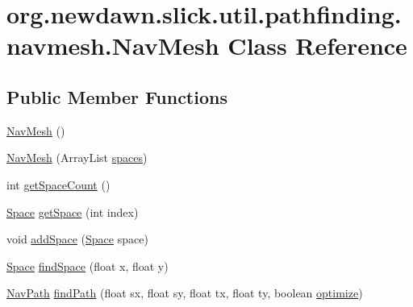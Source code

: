 \hypertarget{classorg_1_1newdawn_1_1slick_1_1util_1_1pathfinding_1_1navmesh_1_1_nav_mesh}{}\section{org.\+newdawn.\+slick.\+util.\+pathfinding.\+navmesh.\+Nav\+Mesh Class Reference}
\label{classorg_1_1newdawn_1_1slick_1_1util_1_1pathfinding_1_1navmesh_1_1_nav_mesh}
\subsection*{Public Member Functions}
\begin{DoxyCompactItemize}
\item 
\mbox{\hyperlink{classorg_1_1newdawn_1_1slick_1_1util_1_1pathfinding_1_1navmesh_1_1_nav_mesh_a869d431a90904428d2ca7ab8060d2408}{Nav\+Mesh}} ()
\item 
\mbox{\hyperlink{classorg_1_1newdawn_1_1slick_1_1util_1_1pathfinding_1_1navmesh_1_1_nav_mesh_a9d478db4c2c95601f314fdaa46abd06d}{Nav\+Mesh}} (Array\+List \mbox{\hyperlink{classorg_1_1newdawn_1_1slick_1_1util_1_1pathfinding_1_1navmesh_1_1_nav_mesh_a753a5f03305449a3c61d01a41c2fb129}{spaces}})
\item 
int \mbox{\hyperlink{classorg_1_1newdawn_1_1slick_1_1util_1_1pathfinding_1_1navmesh_1_1_nav_mesh_abbd3c88a9f491f55a6af41485c359212}{get\+Space\+Count}} ()
\item 
\mbox{\hyperlink{classorg_1_1newdawn_1_1slick_1_1util_1_1pathfinding_1_1navmesh_1_1_space}{Space}} \mbox{\hyperlink{classorg_1_1newdawn_1_1slick_1_1util_1_1pathfinding_1_1navmesh_1_1_nav_mesh_a261df818d2d9a983c1b9771589b03e25}{get\+Space}} (int index)
\item 
void \mbox{\hyperlink{classorg_1_1newdawn_1_1slick_1_1util_1_1pathfinding_1_1navmesh_1_1_nav_mesh_af95eb7b9e8c43bdff8b280c2245fdbd8}{add\+Space}} (\mbox{\hyperlink{classorg_1_1newdawn_1_1slick_1_1util_1_1pathfinding_1_1navmesh_1_1_space}{Space}} space)
\item 
\mbox{\hyperlink{classorg_1_1newdawn_1_1slick_1_1util_1_1pathfinding_1_1navmesh_1_1_space}{Space}} \mbox{\hyperlink{classorg_1_1newdawn_1_1slick_1_1util_1_1pathfinding_1_1navmesh_1_1_nav_mesh_a975721b13902b5107ad636ccb1974653}{find\+Space}} (float x, float y)
\item 
\mbox{\hyperlink{classorg_1_1newdawn_1_1slick_1_1util_1_1pathfinding_1_1navmesh_1_1_nav_path}{Nav\+Path}} \mbox{\hyperlink{classorg_1_1newdawn_1_1slick_1_1util_1_1pathfinding_1_1navmesh_1_1_nav_mesh_a06001526185445260c9f957cb9eb8ac8}{find\+Path}} (float sx, float sy, float tx, float ty, boolean \mbox{\hyperlink{classorg_1_1newdawn_1_1slick_1_1util_1_1pathfinding_1_1navmesh_1_1_nav_mesh_ae0b7a2d894c694edddba9e83e65f7824}{optimize}})
\end{DoxyCompactItemize}
